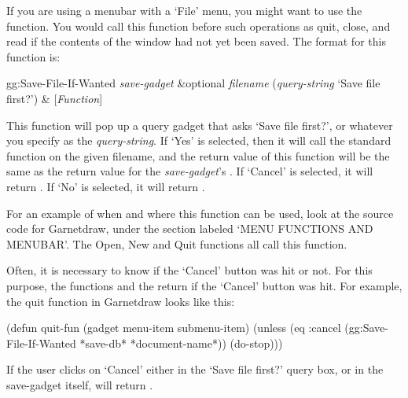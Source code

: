 If you are using a menubar with a `File' menu, you might want to use the
 function.  You would call this function before such
operations as quit, close, and read if the contents of the window had not
yet been saved.  The format for this function is:
\begin{programexample}
gg:Save-File-If-Wanted {\it save-gadget} \&optional {\it filename} ({\it query-string} `Save file first?') & [{\it Function}]
\end{programexample}

This function will pop up a query gadget that asks `Save file first?', or
whatever you specify as the {\it query-string}.
If `Yes' is selected, then it will call the standard
 function on the given filename, and the
return value of this function will be the same as the return value for the
{\it save-gadget}'s .
If `Cancel' is selected, it will return .   If `No' is
selected, it will return .

For an example of when and where this function can be used, look at
the source code for Garnetdraw, under the section labeled `MENU
FUNCTIONS AND MENUBAR'.  The Open, New and Quit functions all call
this function.

Often, it is necessary to know if the `Cancel' button was hit or not.
For this purpose, the functions  and the
 return  if the `Cancel'
button was hit.  For example, the quit function in Garnetdraw looks like
this:
\begin{programexample}
(defun quit-fun (gadget menu-item submenu-item)
  (unless (eq :cancel (gg:Save-File-If-Wanted *save-db* *document-name*))
    (do-stop)))
\end{programexample}

If the user clicks on `Cancel' either in the `Save file first?' query
box, or in the save-gadget itself,  will return
.


